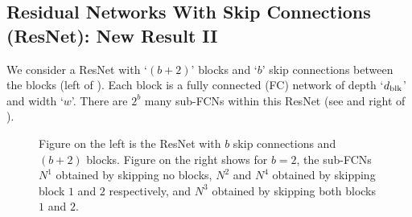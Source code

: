 \subsection{Residual Networks With Skip Connections (ResNet): New Result II}
We consider a ResNet with `$(b+2)$' blocks and `$b$' skip connections between the blocks (left of ). Each block is a fully connected (FC) network of depth `$d_{\text{blk}}$' and width `$w$'. There are $2^b$ many sub-FCNs within this ResNet (see  and right of ).
\begin{figure}[t]
\begin{minipage}{0.5\columnwidth}
\end{minipage}
\begin{minipage}{0.5\columnwidth}
\end{minipage}
\caption{\small{Figure on the left is the ResNet with $b$ skip connections and $(b+2)$ blocks. Figure on the right shows for $b=2$, the sub-FCNs $N^1$ obtained by skipping no blocks, $N^2$ and $N^4$ obtained by skipping block $1$ and $2$ respectively, and $N^3$ obtained by skipping both blocks $1$ and $2$.}}
\label{fig:resnet}
\end{figure}

